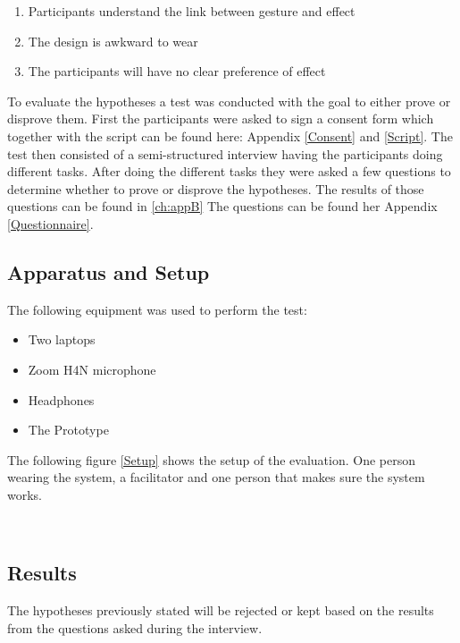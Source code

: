 \begin{enumerate}
\item Participants understand the link between gesture and effect
\item The design is awkward to wear
\item The participants will have no clear preference of effect
\end{enumerate} 

To evaluate the hypotheses a test was conducted with the goal to either prove or disprove them. First the participants were asked to sign a consent form which together with the script can be found here: Appendix \ref{Consent} and \ref{Script}. The test then consisted of a semi-structured interview having the participants doing different tasks. After doing the different tasks they were asked a few questions to determine whether to prove or disprove the hypotheses. The results of those questions can be found in \ref{ch:appB} The questions can be found her Appendix \ref{Questionnaire}. 

\subsection{Apparatus and Setup}

The following equipment was used to perform the test:
\begin{itemize}
 \item Two laptops
 \item Zoom H4N microphone 
 \item Headphones
 \item The Prototype
\end{itemize}

The following figure \ref{Setup} shows the setup of the evaluation. One person wearing the system, a facilitator and one person that makes sure the system works. 

\begin{minipage}{\linewidth}%
\label{Setup}
\end{minipage}\\

\subsection{Results}
The hypotheses previously stated will be rejected or kept based on the results from the questions asked during the interview.

